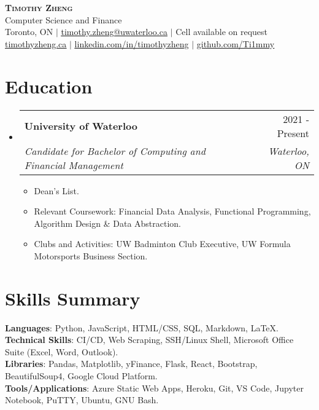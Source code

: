 \documentclass[letterpaper,11pt]{article}
\makeatletter
\newcommand{\resumeItem}[1]{
  \item\small{
    {#1 \vspace{-2pt}}
  }
}
\newcommand{\resumeSubheading}[4]{
  \vspace{-2pt}\item
    \begin{tabular*}{0.97\textwidth}[t]{l@{\extracolsep{\fill}}r}
      \textbf{#1} & #2 \\
      \textit{\small#3} & \textit{\small #4} \\
    \end{tabular*}\vspace{-7pt}
}
\newcommand{\resumeSubHeadingListStart}{\begin{itemize}[leftmargin=0.15in, label={}]}
\newcommand{\resumeSubHeadingListEnd}{\end{itemize}}
\newcommand{\resumeItemListStart}{\begin{itemize}}
\newcommand{\resumeItemListEnd}{\end{itemize}\vspace{-5pt}}
\makeatother
\begin{document}


\begin{center}
    \textbf{\Huge \scshape Timothy Zheng} \\ \vspace{4pt}
    \small Computer Science and Finance
    \\ \vspace{2pt}
    \small Toronto, ON $|$ 
    \href{mailto:timothy.zheng@uwaterloo.ca}{\underline{timothy.zheng@uwaterloo.ca}} $|$ 
    \small Cell available on request
    \\ \vspace{2pt}
    \href{https://timothyzheng.ca}{\underline{timothyzheng.ca}} $| $
    \href{https://linkedin.com/in/timothyzheng}{\underline{linkedin.com/in/timothyzheng}} $|$
    \href{https://github.com/Ti1mmy}{\underline{github.com/Ti1mmy}}
\end{center}


\section{Education}
  \resumeSubHeadingListStart
    \resumeSubheading
      {University of Waterloo}{2021 - Present}
      {Candidate for Bachelor of Computing and Financial
Management}{Waterloo, ON}
          \resumeItemListStart
            \resumeItem{Dean's List.}
            \resumeItem{Relevant Coursework: Financial Data Analysis, Functional Programming, Algorithm Design \& Data Abstraction.}
            \resumeItem{Clubs and Activities: UW Badminton Club Executive, UW Formula Motorsports Business Section.}

            
        \resumeItemListEnd

  \resumeSubHeadingListEnd

\section{Skills Summary}
 \begin{itemize}[leftmargin=0.15in, label={}]
    \small{\item{
     \textbf{Languages}{: Python, JavaScript, HTML/CSS, SQL, Markdown, LaTeX.} \\
     \textbf{Technical Skills}{: CI/CD, Web Scraping, SSH/Linux Shell, Microsoft Office Suite (Excel, Word, Outlook).} \\
     \textbf{Libraries}{: Pandas, Matplotlib, yFinance, Flask, React, Bootstrap, BeautifulSoup4, Google Cloud Platform.} \\
     \textbf{Tools/Applications}{: Azure Static Web Apps, Heroku, Git, VS Code, Jupyter Notebook, PuTTY, Ubuntu, GNU Bash.}
    }}
 \end{itemize}
\end{document}
